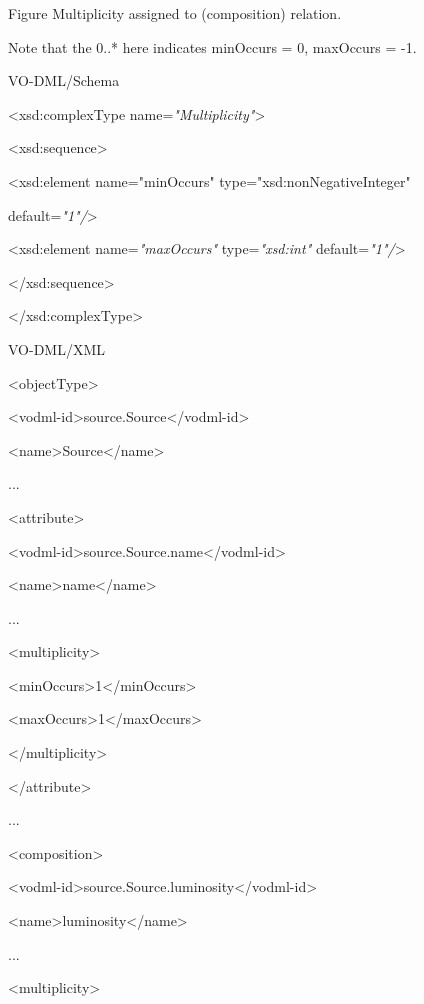 \documentclass[10pt,a4paper]{ivoa}
\begin{document}
Figure Multiplicity assigned to (composition) relation.

Note that the 0..* here indicates minOccurs = 0, maxOccurs = -1.

VO-DML/Schema

\textless xsd:complexType name=\emph{"Multiplicity"}\textgreater{}

\textless xsd:sequence\textgreater{}

\textless xsd:element name="minOccurs" type="xsd:nonNegativeInteger"

default=\emph{"1"/}\textgreater{}

\textless xsd:element name=\emph{"maxOccurs"} type=\emph{"xsd:int"}
default=\emph{"1"/}\textgreater{}

\textless/xsd:sequence\textgreater{}

\textless/xsd:complexType\textgreater{}

VO-DML/XML

\protect\hypertarget{_Type_extends_ReferencableElement}{}{}\textless objectType\textgreater{}

\textless vodml-id\textgreater source.Source\textless/vodml-id\textgreater{}

\textless name\textgreater Source\textless/name\textgreater{}

...

\textless attribute\textgreater{}

\textless vodml-id\textgreater source.Source.name\textless/vodml-id\textgreater{}

\textless name\textgreater name\textless/name\textgreater{}

...

\textless multiplicity\textgreater{}

\textless minOccurs\textgreater1\textless/minOccurs\textgreater{}

\textless maxOccurs\textgreater1\textless/maxOccurs\textgreater{}

\textless/multiplicity\textgreater{}

\textless/attribute\textgreater{}

...

\textless composition\textgreater{}

\textless vodml-id\textgreater source.Source.luminosity\textless/vodml-id\textgreater{}

\textless name\textgreater luminosity\textless/name\textgreater{}

...

\textless multiplicity\textgreater{}
\end{document}
